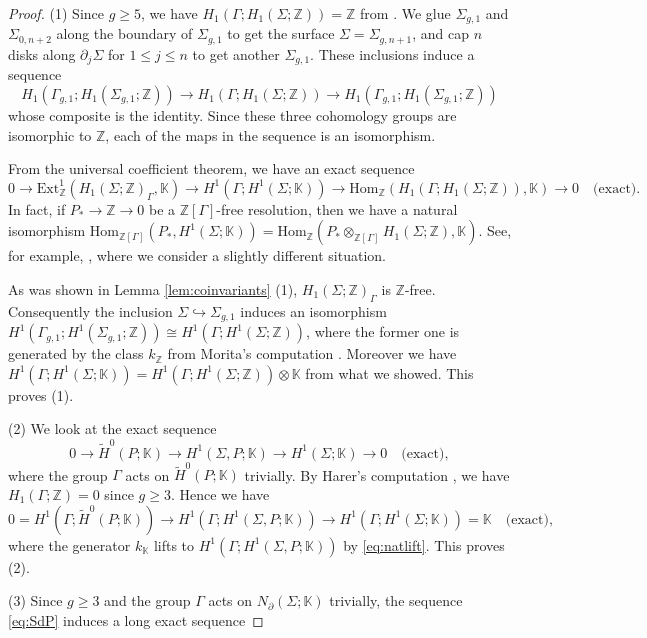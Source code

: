 \documentclass[a4paper,12pt, twoside]{amsart}
\theoremstyle{definition}
\theoremstyle{remark}
\numberwithin{equation}{section}
\newcommand\bK{{\mathbb{K}}}
\newcommand\bZ{{\mathbb{Z}}}
\newcommand\Hom{\mathrm{Hom}}
\newcommand\pa{\partial}
\begin{document}
\begin{proof} (1) Since $g \geq 5$, we have $H_1(\Gamma; H_1(\Sigma;\bZ)) = \bZ$ from \cite[Theorem 7.1]{H91}. We glue $\Sigma_{g,1}$ and $\Sigma_{0,n+2}$ along the boundary of $\Sigma_{g,1}$ to get the surface $\Sigma = \Sigma_{g,n+1}$, and cap $n$ disks along $\pa_j\Sigma$ for $1 \leq j \leq n$ to get another $\Sigma_{g,1}$. These inclusions induce a sequence 
$$
H_1(\Gamma_{g,1}; H_1(\Sigma_{g,1}; \bZ))
\to H_1(\Gamma; H_1(\Sigma; \bZ))
\to H_1(\Gamma_{g,1}; H_1(\Sigma_{g,1}; \bZ))
$$
whose composite is the identity. Since these three cohomology groups are isomorphic to $\bZ$, each of the maps in the sequence is an isomorphism. 
\par
From the universal coefficient theorem, we have an exact sequence
$$
0 \to \mathrm{Ext}^1_{\bZ}(H_1(\Sigma; \bZ)_\Gamma, \bK) 
\to H^1(\Gamma; H^1(\Sigma; \bK))
\to \Hom_\bZ(H_1(\Gamma; H_1(\Sigma; \bZ)), \bK) \to 0
\quad \text{(exact)}.
$$
In fact, if $P_* \to \bZ \to 0$ be a $\bZ[\Gamma]$-free resolution, then we have a natural isomorphism $\Hom_{\bZ[\Gamma]}(P_*, H^1(\Sigma; \bK))
= \Hom_\bZ(P_*\otimes_{\bZ[\Gamma]}H_1(\Sigma; \bZ), \bK)$. See, for example, \cite[Lemma 2.4]{KS1}, where we consider a slightly different situation. \par
As was shown in Lemma \ref{lem:coinvariants} (1), 
$H_1(\Sigma; \bZ)_\Gamma$ is $\bZ$-free. 
Consequently the inclusion $\Sigma \hookrightarrow \Sigma_{g,1}$ induces an isomorphism $H^1(\Gamma_{g,1}; H^1(\Sigma_{g,1}; \bZ)) \cong 
H^1(\Gamma; H^1(\Sigma; \bZ))$, where the former one is generated by the class $k_{\bZ}$ from Morita's computation \cite{Mo89}. Moreover we have $H^1(\Gamma; H^1(\Sigma; \bK)) = H^1(\Gamma; H^1(\Sigma; \bZ))\otimes\bK$ from what we showed. This proves (1).\par
(2)  We look at the exact sequence 
$$
0 \to \widetilde{H}^0(P; \bK) \to H^1(\Sigma, P; \bK) \to H^1(\Sigma; \bK) \to 0 \quad\text{(exact)},
$$
where the group $\Gamma$ acts on $\widetilde{H}^0(P; \bK)$ trivially. 
By Harer's computation \cite[Lemma 1.1]{H83}, we have $H_1(\Gamma; \bZ) = 0$ since $g \geq 3$. Hence we have 
$$
0 = H^1(\Gamma; \widetilde{H}^0(P; \bK)) \to 
H^1(\Gamma; H^1(\Sigma, P; \bK)) \to 
H^1(\Gamma; H^1(\Sigma; \bK)) = \bK \quad \text{(exact)},
$$
where the generator $k_\bK$ lifts to $H^1(\Gamma; H^1(\Sigma, P; \bK))$ by \eqref{eq:natlift}. This proves (2). \par
(3) Since $g \geq 3$ and the group $\Gamma$ acts on $N_\pa(\Sigma; \bK)$ trivially, the sequence \eqref{eq:SdP} induces a long exact sequence

\end{proof}
\end{document}
